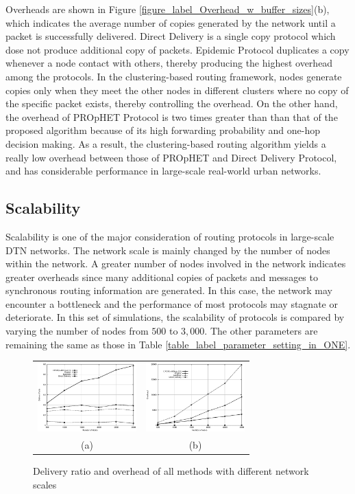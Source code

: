 \documentclass[conference]{IEEEtran}
\begin{document}
Overheads are shown in Figure \ref{figure_label_Overhead_w_buffer_sizes}(b), which indicates the average number of copies generated by the network until a packet is successfully delivered. Direct Delivery is a single copy protocol which dose not produce additional copy of packets. Epidemic Protocol duplicates a copy whenever a node contact with others, thereby producing the highest overhead among the protocols. In the clustering-based routing framework, nodes generate copies only when they meet the other nodes in different clusters where no copy of the specific packet exists, thereby controlling the overhead. On the other hand, the overhead of  PROpHET Protocol is two times greater than than that of the proposed algorithm because of its high forwarding probability and one-hop decision making. As a result, the clustering-based routing algorithm yields a really low overhead between those of PROpHET and Direct Delivery Protocol, and has considerable performance in large-scale real-world urban networks.

\subsection{Scalability}

Scalability is one of the major consideration of routing protocols in large-scale DTN networks. The network scale is mainly changed by the number of nodes within the network. A greater number of nodes involved in the network indicates greater overheads since many additional copies of packets and messages to synchronous routing information are generated. In this case, the network may encounter a bottleneck and the performance of most protocols may stagnate or deteriorate. In this set of simulations, the scalability of protocols is compared by varying the number of nodes from $500$ to $3,000$. The other parameters are remaining the same as those in Table \ref{table_label_parameter_setting_in_ONE}.

\begin{figure}
\centering
\begin{tabular}{cc}
    \includegraphics[width=1.5in]{figures_1/clusterScalability_delivery_radio.eps}&
     \includegraphics[width=1.5in]{figures_1/clusterScalability-overhead.eps}\\
   (a) & (b)
   \end{tabular}
    \caption{Delivery ratio and overhead of all methods with different network scales}\label{figure_label_clusterPerformance-deliveryrate}\label{figure_label_clusterPerformance-overhead}
\end{figure}
\end{document}
